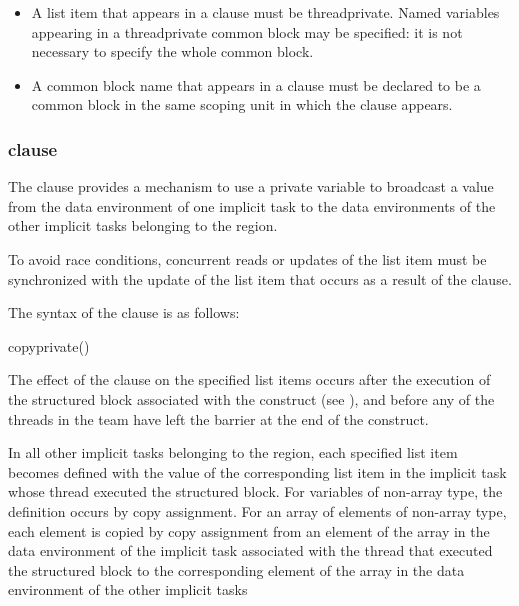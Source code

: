 \fortranspecificstart
\begin{itemize}
\item A list item that appears in a  clause must be threadprivate. Named variables 
appearing in a threadprivate common block may be specified: it is not necessary to 
specify the whole common block. 

\item A common block name that appears in a  clause must be declared to be a 
common block in the same scoping unit in which the  clause appears.
\end{itemize}
\fortranspecificend









\subsubsection{ clause}
\label{subsubsec:copyprivate clause}
\summary
The  clause provides a mechanism to use a private variable to broadcast 
a value from the data environment of one implicit task to the data environments of the 
other implicit tasks belonging to the  region.

To avoid race conditions, concurrent reads or updates of the list item must be 
synchronized with the update of the list item that occurs as a result of the 
 clause.

\syntax
The syntax of the  clause is as follows:

\begin{boxedcode}
copyprivate()
\end{boxedcode}

\descr
The effect of the  clause on the specified list items occurs after the 
execution of the structured block associated with the  construct (see 
), 
and before any of the threads in the team have left the barrier 
at the end of the construct.

\ccppspecificstart
In all other implicit tasks belonging to the  region, each specified list item 
becomes defined with the value of the corresponding list item in the implicit task whose 
thread executed the structured block. For variables of non-array type, the definition 
occurs by copy assignment. For an array of elements of non-array type, each element is
copied by copy assignment from an element of the array in the data environment of the 
implicit task associated with the thread that executed the structured block to the 
corresponding element of the array in the data environment of the other implicit tasks
\ccppspecificend

